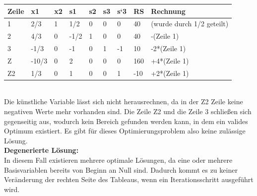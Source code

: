 \begin{table}[!ht]
\begin{tabular}{|l|l|l|l|l|l|l|l|l|}
\hline
\rowcolor[HTML]{C0C0C0} 
Zeile                      & x1                            & x2                        & s1                           & s2                        & s3                        & s`3 & RS  & Rechnung                  \\ \hline
\cellcolor[HTML]{C0C0C0}1  & \cellcolor[HTML]{FFFFFF}2/3   & \cellcolor[HTML]{FFFFFF}1 & \cellcolor[HTML]{FFFFFF}1/2  & \cellcolor[HTML]{FFFFFF}0 & \cellcolor[HTML]{FFFFFF}0 & 0   & 40  & (wurde durch 1/2 geteilt) \\ \hline
\cellcolor[HTML]{C0C0C0}2  & \cellcolor[HTML]{FFFFFF}4/3   & \cellcolor[HTML]{FFFFFF}0 & \cellcolor[HTML]{FFFFFF}-1/2 & \cellcolor[HTML]{FFFFFF}1 & \cellcolor[HTML]{FFFFFF}0 & 0   & 40  & -(Zeile 1)                \\ \hline
\cellcolor[HTML]{C0C0C0}3  & \cellcolor[HTML]{FFFFFF}-1/3  & \cellcolor[HTML]{FFFFFF}0 & \cellcolor[HTML]{FFFFFF}-1   & \cellcolor[HTML]{FFFFFF}0 & \cellcolor[HTML]{FFFFFF}1 & -1  & 10  & -2*(Zeile 1)              \\ \hline
\cellcolor[HTML]{C0C0C0}Z  & \cellcolor[HTML]{FFFFFF}-10/3 & \cellcolor[HTML]{FFFFFF}0 & \cellcolor[HTML]{FFFFFF}2    & \cellcolor[HTML]{FFFFFF}0 & \cellcolor[HTML]{FFFFFF}0 & 0   & 160 & +4*(Zeile 1)              \\ \hline
\cellcolor[HTML]{C0C0C0}Z2 & 1/3                           & 0                         & 1                            & 0                         & 0                         & 1   & -10 & +2*(Zeile 1)              \\ \hline
\end{tabular}
\end{table}
\\
Die künstliche Variable lässt sich nicht herausrechnen, da in der Z2 Zeile keine negativen Werte mehr vorhanden sind. Die Zeile Z2 und die Zeile 3 schließen sich gegenseitig aus, wodurch kein Bereich gefunden werden kann, in dem ein valides Optimum existiert. Es gibt für dieses Optimierungsproblem also keine zulässige Lösung.\\
\textbf{Degenerierte Lösung: }\\
In diesem Fall existieren mehrere optimale Lösungen, da eine oder mehrere Basisvariablen bereits von Beginn an Null sind. Dadurch kommt es zu keiner Veränderung der rechten Seite des Tableaus, wenn ein Iterationsschritt ausgeführt wird.\\
